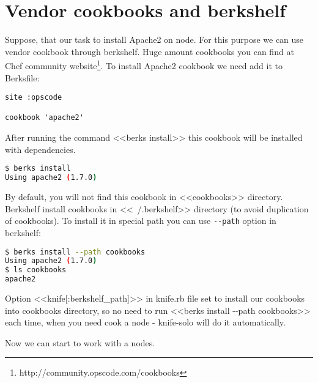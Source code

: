 \section{Vendor cookbooks and berkshelf}

Suppose, that our task to install Apache2 on node. For this purpose we can use vendor cookbook through berkshelf. Huge amount cookbooks you can find at Chef community website\footnote{http://community.opscode.com/cookbooks}. To install Apache2 cookbook we need add it to Berksfile:

\begin{lstlisting}[label=lst:my-cloud-berkshelf1,title=my-cloud/Berksfile]
site :opscode

cookbook 'apache2'
\end{lstlisting}

After running the command <<berks install>> this cookbook will be installed with dependencies.

\begin{lstlisting}[language=Bash,label=lst:my-cloud-berkshelf2,title=my-cloud/Berksfile]
$ berks install
Using apache2 (1.7.0)
\end{lstlisting}

By default, you will not find this cookbook in <<cookbooks>> directory. Berkshelf install cookbooks in <<~/.berkshelf>> directory (to avoid duplication of cookbooks). To install it in special path you can use \texttt{-\--path} option in berkshelf:

\begin{lstlisting}[language=Bash,label=lst:my-cloud-berkshelf3,title=my-cloud/Berksfile]
$ berks install --path cookbooks
Using apache2 (1.7.0)
$ ls cookbooks
apache2
\end{lstlisting}

Option <<knife[:berkshelf\_path]>> in knife.rb file set to install our cookbooks into cookbooks directory, so no need to run <<berks install -\--path cookbooks>> each time, when you need cook a node - knife-solo will do it automatically.

Now we can start to work with a nodes.